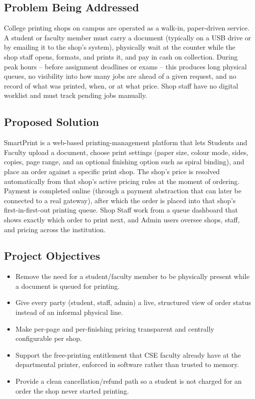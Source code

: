 \documentclass[12pt,a4paper]{report}
\begin{document}
\subsection*{Problem Being Addressed}
College printing shops on campus are operated as a walk-in, paper-driven service. A student or faculty member must carry a document (typically on a USB drive or by emailing it to the shop's system), physically wait at the counter while the shop staff opens, formats, and prints it, and pay in cash on collection. During peak hours -- before assignment deadlines or exams -- this produces long physical queues, no visibility into how many jobs are ahead of a given request, and no record of what was printed, when, or at what price. Shop staff have no digital worklist and must track pending jobs manually.

\subsection*{Proposed Solution}
SmartPrint is a web-based printing-management platform that lets Students and Faculty upload a document, choose print settings (paper size, colour mode, sides, copies, page range, and an optional finishing option such as spiral binding), and place an order against a specific print shop. The shop's price is resolved automatically from that shop's active pricing rules at the moment of ordering. Payment is completed online (through a payment abstraction that can later be connected to a real gateway), after which the order is placed into that shop's first-in-first-out printing queue. Shop Staff work from a queue dashboard that shows exactly which order to print next, and Admin users oversee shops, staff, and pricing across the institution.

\subsection*{Project Objectives}
\begin{itemize}[leftmargin=0.7cm]
  \item Remove the need for a student/faculty member to be physically present while a document is queued for printing.
  \item Give every party (student, staff, admin) a live, structured view of order status instead of an informal physical line.
  \item Make per-page and per-finishing pricing transparent and centrally configurable per shop.
  \item Support the free-printing entitlement that CSE faculty already have at the departmental printer, enforced in software rather than trusted to memory.
  \item Provide a clean cancellation/refund path so a student is not charged for an order the shop never started printing.
\end{itemize}
\end{document}
